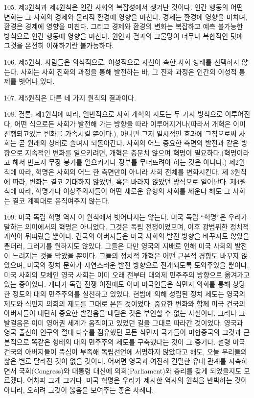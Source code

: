 \documentclass[11pt,a4paper]{article}
\begin{document}
\begin{multicols}{2}
105. 제3원칙과 제4원칙은 인간 사회의 복잡성에서 생겨난 것이다. 인간 행동의 어떤 변화는 그 사회의  경제와 물리적 환경에 영향을 미친다. 경제는 환경에 영향을 미치며, 환경은 경제에 영향을 미친다.  그리고 경제와 환경의 변화는 복잡하고 예측 불가능한 방식으로 인간 행동에 영향을 미친다. 원인과  결과의 그물망이 너무나 복합적인 탓에 그것을 온전히 이해하기란 불가능하다.  


106. 제5원칙. 사람들은 의식적으로, 이성적으로 자신이 속한 사회 형태를 선택하지 않는다. 사회는 사회 진화의 과정을 통해 발전하는 바, 그 진화 과정은 인간의 이성적 통제를 벗어나 있다.  


107. 제5원칙은 다른 네 가지 원칙의 결과이다.  


108. 결론: 제1원칙에 따라, 일반적으로 사회 개혁의 시도는 두 가지 방식으로 이루어진다. 어떤 식으로든 사회가 발전해 가는 방향을 따라 이루어지거나(따라서 개혁은 이미 진행되고있는 변화를  가속시킬 뿐이다.), 아니면 그저 일시적인 효과에 그침으로써 사회는 곧 원래의 상태로 슬며시  되돌아간다. 사회의 어느 중요한 측면의 발전과 같은 방향으로 지속적인 변화를 일으키려면, 개혁은  충분치 않으며 혁명이 필요하다.(혁명이라고 해서 반드시 무장 봉기를 일으키거나 정부를 무너뜨려야  하는 것은 아니다.) 제2원칙에 따라, 혁명은 사회의 어느 한 측면만이 아니라 사회 전체를 변화시킨다. 제 3원칙에 따라, 변화는 결코 기대하지 않았던, 혹은 바라지 않았던 방식으로 일어난다. 제4원칙에 따라,  혁명가나 이상주의자들이 어떤 새로운 유형의 사회를 세운다 해도 그 사회는 결코 계획대로 움직여주지  않는다.  


109. 미국 독립 혁명 역시 이 원칙에서 벗어나지는 않는다. 미국 독립 “혁명”은 우리가 말하는 의미에서의 혁명은 아니었다. 그것은 독립 전쟁이었으며, 이후 광범위한 정치적 개혁이 뒤따랐을 뿐이다. 건국의  아버지들은 미국 사회의 발전 방향을 바꾸지도 않았을 뿐더러, 그러기를 원하지도 않았다. 그들은 다만  영국의 지배로 인해 미국 사회의 발전이 느려지는 것을 막았을 뿐이다. 그들의 정치적 개혁은 어떤 근본적 경향도 바꾸지 않았으며, 미국의 정치 문화가 자연스러운 발전 방향으로 전개되도록 도와주었을 뿐이다.  미국 사회의 모체인 영국 사회는 이미 오래 전부터 대의제 민주주의 방향으로 옮겨가고 있는 중이었다.  게다가 독립 전쟁 이전에도 이미 미국인들은 식민지 의회를 통해 상당한 정도의 대의 민주주의를  실천하고 있었다. 헌법에 의해 성립된 정치 제도는 영국의 제도와 식민지 의회의 제도를 그대로 본뜬 것이었다. 중요한 변화와 함께 미국 건국의 아버지들이 대단히 중요한 발걸음을 내딛은 것은 부인할 수  없는 사실이다. 그러나 그 발걸음은 이미 영어권 세계가 움직이고 있었던 길을 그대로 따라간 것이었다.  영국과 영국 출신이 인구의 절대 다수를 점유했던 모든 식민지 국가들이 미합중국의 그것과 근본적으로  똑같은 형태의 대의 민주주의 제도를 구축했다는 것이 그 증거다. 설령 미국 건국의 아버지들이 뚝심이  부족해 독립선언에 서명하지 않았다고 해도, 오늘 우리들의 삶은 별로 달라진 것이 없을 것이다. 어쩌면  영국과 여전히 긴밀한 유대 관계를 지속하면서 국회(Congress)와 대통령 대신에 의회(Parliament)와 
총리를 갖게 되었을지도 모르겠다. 어차피 그게 그거다. 미국 혁명은 우리가 제시한 역사의 원칙을  반박하는 것이 아니라, 오히려 그것이 옳음을 보여주는 좋은 사례다.  



\end{multicols}
\end{document}
